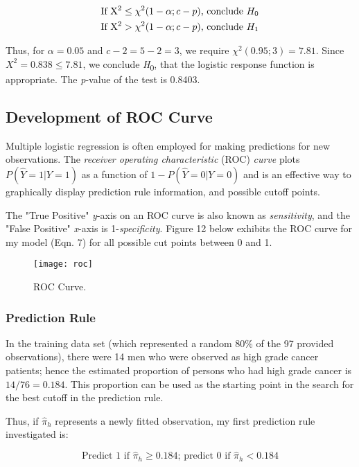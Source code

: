 \begin{align}
\begin{split}
	\textrm{If X\textsuperscript{2}} \leq \chi^2(1-\alpha; c-p)\textrm{, conclude } H_0 \\
	\textrm{If X\textsuperscript{2}} > \chi^2(1-\alpha; c-p)\textrm{, conclude } H_1
\end{split}
\end{align}

Thus, for \(\alpha=0.05\) and \(c-2=5-2=3\), we require \(\chi^2(0.95; 3)=7.81\). Since \(X^2=0.838\leq7.81\), we conclude \textit{H}\textsubscript{0}, that the logistic response function is appropriate. The \textit{p}-value of the test is 0.8403.


\subsection{Development of ROC Curve}
Multiple logistic regression is often employed for making predictions for new observations.
The \textit{receiver operating characteristic} (ROC) \textit{curve} plots \(P(\hat{Y}=1 | Y=1)\) as a function of \(1-P(\hat{Y}=0 | Y=0)\) and is an effective way to graphically display prediction rule information, and possible cutoff points. \par
The "True Positive" \textit{y}-axis on an ROC curve is also known as \textit{sensitivity}, and the "False Positive" \textit{x}-axis is 1-\textit{specificity}. Figure 12 below exhibits the ROC curve for my model (Eqn. 7) for all possible cut points between 0 and 1.

\begin{figure}[H]
	\centering
	\texttt{[image: roc]}
	\caption{ROC Curve.}
\end{figure}

\subsubsection{Prediction Rule}
In the training data set (which represented a random 80\% of the 97 provided observations), there were 14 men who were observed as high grade cancer patients; hence the estimated proportion of persons who had high grade cancer is \(14/76=0.184\). This proportion can be used as the starting point in the search for the best cutoff in the prediction rule. \par
Thus, if \(\hat{\pi}_h\) represents a newly fitted observation, my first prediction rule investigated is:

\begin{equation}
	\textrm{Predict 1 if } \hat{\pi}_h \geq 0.184\textrm{; predict 0 if } \hat{\pi}_h < 0.184
\end{equation}

